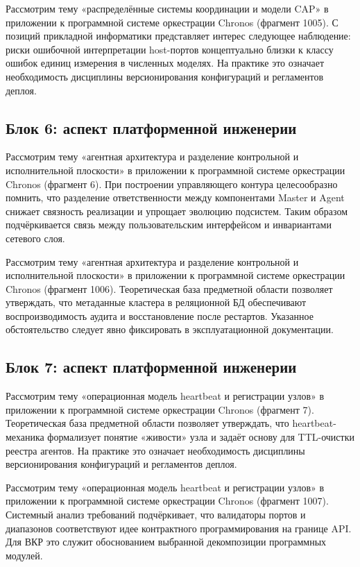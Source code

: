  Рассмотрим тему «распределённые системы координации и модели CAP» в приложении к программной системе оркестрации Chronos (фрагмент 1005). С позиций прикладной информатики представляет интерес следующее наблюдение: риски ошибочной интерпретации host-портов концептуально близки к классу ошибок единиц измерения в численных моделях. На практике это означает необходимость дисциплины версионирования конфигураций и регламентов деплоя.

\subsection{Блок 6: аспект платформенной инженерии}
 Рассмотрим тему «агентная архитектура и разделение контрольной и исполнительной плоскости» в приложении к программной системе оркестрации Chronos (фрагмент 6). При построении управляющего контура целесообразно помнить, что разделение ответственности между компонентами Master и Agent снижает связность реализации и упрощает эволюцию подсистем. Таким образом подчёркивается связь между пользовательским интерфейсом и инвариантами сетевого слоя.

 Рассмотрим тему «агентная архитектура и разделение контрольной и исполнительной плоскости» в приложении к программной системе оркестрации Chronos (фрагмент 1006). Теоретическая база предметной области позволяет утверждать, что метаданные кластера в реляционной БД обеспечивают воспроизводимость аудита и восстановление после рестартов. Указанное обстоятельство следует явно фиксировать в эксплуатационной документации.

\subsection{Блок 7: аспект платформенной инженерии}
 Рассмотрим тему «операционная модель heartbeat и регистрации узлов» в приложении к программной системе оркестрации Chronos (фрагмент 7). Теоретическая база предметной области позволяет утверждать, что heartbeat-механика формализует понятие «живости» узла и задаёт основу для TTL-очистки реестра агентов. На практике это означает необходимость дисциплины версионирования конфигураций и регламентов деплоя.

 Рассмотрим тему «операционная модель heartbeat и регистрации узлов» в приложении к программной системе оркестрации Chronos (фрагмент 1007). Системный анализ требований подчёркивает, что валидаторы портов и диапазонов соответствуют идее контрактного программирования на границе API. Для ВКР это служит обоснованием выбранной декомпозиции программных модулей.

